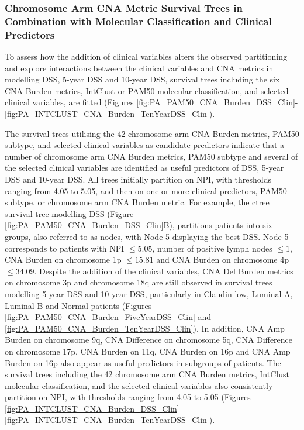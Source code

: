 \subsubsection{Chromosome Arm CNA Metric Survival Trees in Combination with Molecular Classification and Clinical Predictors} 
To assess how the addition of clinical variables alters the observed partitioning and explore interactions between the clinical variables and CNA metrics in modelling DSS, 5-year DSS and 10-year DSS, survival trees including the six CNA Burden metrics, IntClust or PAM50 molecular classification, and selected clinical variables, are fitted (Figures \ref{fig:PA_PAM50_CNA_Burden_DSS_Clin}-\ref{fig:PA_INTCLUST_CNA_Burden_TenYearDSS_Clin}). 

The survival trees utilising the 42 chromosome arm CNA Burden metrics, PAM50 subtype, and selected clinical variables as candidate predictors indicate that a number of chromosome arm CNA Burden metrics, PAM50 subtype and several of the selected clinical variables are identified as useful predictors of DSS, 5-year DSS and 10-year DSS. All trees initially partition on NPI, with thresholds ranging from 4.05 to 5.05, and then on one or more clinical predictors, PAM50 subtype, or chromosome arm CNA Burden metric. For example, the ctree survival tree modelling DSS (Figure \ref{fig:PA_PAM50_CNA_Burden_DSS_Clin}B), partitions patients into six groups, also referred to as nodes, with Node 5 displaying the best DSS. Node 5 corresponds to patients with NPI $\leq 5.05$, number of positive lymph nodes $\leq 1$, CNA Burden on chromosome 1p $\leq 15.81$ and CNA Burden on chromosome 4p $\leq 34.09$. Despite the addition of the clinical variables, CNA Del Burden metrics on chromosome 3p and chromosome 18q are still observed in survival trees modelling 5-year DSS and 10-year DSS, particularly in Claudin-low, Luminal A, Luminal B and Normal patients (Figures \ref{fig:PA_PAM50_CNA_Burden_FiveYearDSS_Clin} and \ref{fig:PA_PAM50_CNA_Burden_TenYearDSS_Clin}). In addition, CNA Amp Burden on chromosome 9q, CNA Difference on chromosome 5q, CNA Difference on chromosome 17p, CNA Burden on 11q, CNA Burden on 16p and CNA Amp Burden on 16p also appear as useful predictors in subgroups of patients. The survival trees including the 42 chromosome arm CNA Burden metrics, IntClust molecular classification, and the selected clinical variables also consistently partition on NPI, with thresholds ranging from 4.05 to 5.05 (Figures \ref{fig:PA_INTCLUST_CNA_Burden_DSS_Clin}-\ref{fig:PA_INTCLUST_CNA_Burden_TenYearDSS_Clin}). 

